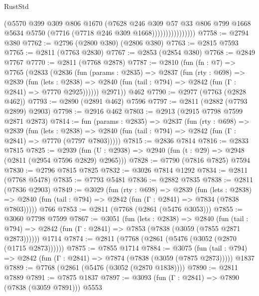\begin{lexlean}{RustStd}
\begin{coremodule}
                            (@5570
                              @399
                              @309
                              @806
                              @1670
                              (@7628
                                @246
                                @309
                                @57
                                @33
                                @806
                                @799
                                @1668
                                @5634
                                @5750
                                (@7716 (@7718 @246 @309 @1668))))))))))))))))
@7758 := @2794 @380
@7762 := @2796 (@2800 @380) (@2806 @380)
@7763 := @2815 @7593
@7765 := @2811 (@7763 @2830)
@7767 := @2853 (@2854 @380)
@7768 := @2849 @7767
@7770 := @2811 (@7768 @2878)
@7787 := @2810
    (fun (fn : @7) =>
    @7765
      (@2833
        (@2836
          (fun (params : @2835) =>
          @2837
            (fun (rty : @698) =>
            @2839
              (fun (lets : @2838) =>
              @2840 (fun (tail : @794) => @2842 (fun (Γ : @2841) => @7770 @2925))))))
        @2971))
    @462
@7790 := @2977 (@7763 (@2828 @462))
@7793 := @2890 (@2891 @462) @7596
@7797 := @2811 (@2882 (@7793 @2899) @2903)
@7798 := @2916 @462
@7803 := @2913 (@2915 @7798 @7599 @2871 @2873)
@7814 := fun (params : @2835) =>
  @2837
    (fun (rty : @698) =>
    @2839
      (fun (lets : @2838) =>
      @2840 (fun (tail : @794) => @2842 (fun (Γ : @2841) => @7770 (@7797 @7803)))))
@7815 := @2836 @7814
@7816 := @2833 @7815
@7825 := @2939 (fun (U : @2938) => @2940 (fun (t : @29) => @2948 (@2811 (@2954 @7596 @2829) @2965)))
@7828 := @7790 (@7816 @7825) @7594
@7830 := @2796 @7815 @7825
@7832 := @3026 @7814 @1292
@7834 := @2811 (@7768 @5478)
@7835 := @7793 @5481
@7836 := @2882 @7835
@7838 := @2811 (@7836 @2903)
@7849 := @3029
    (fun (rty : @698) =>
    @2839
      (fun (lets : @2838) =>
      @2840 (fun (tail : @794) => @2842 (fun (Γ : @2841) => @7834 (@7838 @7803)))))
    @766
@7853 := @2811 (@7768 (@2861 (@5476 @3053)))
@7855 := @3060 @7798 @7599
@7867 := @3051
    (fun (lets : @2838) =>
    @2840
      (fun (tail : @794) => @2842 (fun (Γ : @2841) => @7853 (@7838 (@3059 (@7855 @2871 @2873))))))
    @1714
@7874 := @2811 (@7768 (@2861 (@5476 (@3052 (@2870 (@1715 @2873))))))
@7875 := @7855 @1714
@7884 := @3075
    (fun (tail : @794) => @2842 (fun (Γ : @2841) => @7874 (@7838 (@3059 (@7875 @2873)))))
    @1837
@7889 := @7768 (@2861 (@5476 (@3052 (@2870 @1838))))
@7890 := @2811 @7889
@7891 := @7875 @1837
@7897 := @3093 (fun (Γ : @2841) => @7890 (@7838 (@3059 @7891))) @5553

\end{coremodule}
\end{lexlean}
